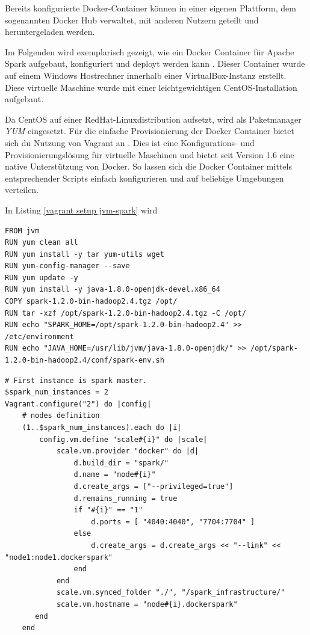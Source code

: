 Bereits konfigurierte Docker-Container können in einer eigenen Plattform, dem sogenannten Docker Hub verwaltet, mit anderen Nutzern geteilt und heruntergeladen werden. 

Im Folgenden wird exemplarisch gezeigt, wie ein Docker Container für Apache Spark aufgebaut, konfiguriert und deployt werden kann . Dieser Container wurde auf einem Windows Hostrechner innerhalb einer VirtualBox-Instanz erstellt. Diese virtuelle Maschine wurde mit einer leichtgewichtigen CentOS-Installation aufgebaut. 

Da CentOS auf einer RedHat-Linuxdistribution aufsetzt, wird als Paketmanager \textit{YUM} eingesetzt. Für die einfache Provisionierung der Docker Container bietet sich du Nutzung von Vagrant an . Dies ist eine Konfigurations- und Provisionierungslösung für virtuelle Maschinen und bietet seit Version 1.6 eine native Unterstützung von Docker. So lassen sich die Docker Container mittels entsprechender Scripts einfach konfigurieren und auf beliebige Umgebungen verteilen. 

In Listing \ref{vagrant setup jvm-spark} wird 

\begin{lstlisting}[label=vagrant setup jvm-spark,caption=Setup Spark mit eigener JVM]
FROM jvm
RUN yum clean all
RUN yum install -y tar yum-utils wget
RUN yum-config-manager --save 
RUN yum update -y
RUN yum install -y java-1.8.0-openjdk-devel.x86_64
COPY spark-1.2.0-bin-hadoop2.4.tgz /opt/
RUN tar -xzf /opt/spark-1.2.0-bin-hadoop2.4.tgz -C /opt/
RUN echo "SPARK_HOME=/opt/spark-1.2.0-bin-hadoop2.4" >> /etc/environment
RUN echo "JAVA_HOME=/usr/lib/jvm/java-1.8.0-openjdk/" >> /opt/spark-1.2.0-bin-hadoop2.4/conf/spark-env.sh

\end{lstlisting}

\begin{lstlisting}[label=setup spark,caption=Vagrant Provisionierungs-Skript für Spark]
# First instance is spark master.
$spark_num_instances = 2
Vagrant.configure("2") do |config|
    # nodes definition
    (1..$spark_num_instances).each do |i|
        config.vm.define "scale#{i}" do |scale|
            scale.vm.provider "docker" do |d|
                d.build_dir = "spark/"
                d.name = "node#{i}"
                d.create_args = ["--privileged=true"]
                d.remains_running = true
                if "#{i}" == "1"
                    d.ports = [ "4040:4040", "7704:7704" ] 
                else
                    d.create_args = d.create_args << "--link" << "node1:node1.dockerspark"
                end
            end
            scale.vm.synced_folder "./", "/spark_infrastructure/"
            scale.vm.hostname = "node#{i}.dockerspark"
       end 
    end

\end{lstlisting}




